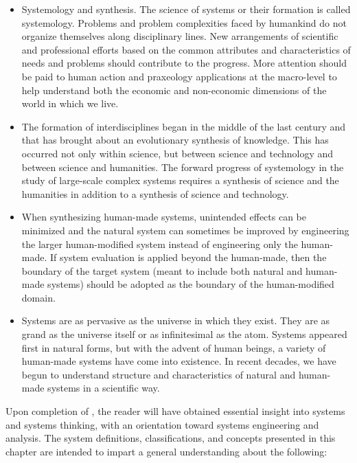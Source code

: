 \begin{itemize}
\item Systemology and synthesis. The science of systems or their formation is called systemology. Problems and problem complexities faced by humankind do not organize themselves along disciplinary lines. New arrangements of scientific and professional efforts based on the common attributes and characteristics of needs and problems should contribute to the progress. More attention should be paid to human action and praxeology applications at the macro-level to help understand both the economic and non-economic dimensions of the world in which we live.
\item The formation of interdisciplines began in the middle of the last century and that has brought about an evolutionary synthesis of knowledge. This has occurred not only within science, but between science and technology and between science and humanities. The forward progress of systemology in the study of large-scale complex systems requires a synthesis of science and the humanities in addition to a synthesis of science and technology.
\item When synthesizing human-made systems, unintended effects can be minimized and the natural system can sometimes be improved by engineering the larger human-modified system instead of engineering only the human-made. If system evaluation is applied beyond the human-made, then the boundary of the target system (meant to include both natural and human-made systems) should be adopted as the boundary of the human-modified domain.
\item Systems are as pervasive as the universe in which they exist. They are as grand as the universe itself or as infinitesimal as the atom. Systems appeared first in natural forms, but with the advent of human beings, a variety of human-made systems have come into existence. In recent decades, we have begun to understand structure and characteristics of natural and human-made systems in a scientific way.
\end{itemize}

Upon completion of , the reader will have obtained essential insight into systems and systems thinking, with an orientation toward systems engineering and analysis. The system definitions, classifications, and concepts presented in this chapter are intended to impart a general understanding about the following:

